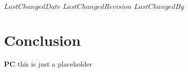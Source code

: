 {$LastChangedDate$}
{$LastChangedRevision$} {$LastChangedBy$}


\section{Conclusion}

{\bf PC}{ this is just a placeholder}
